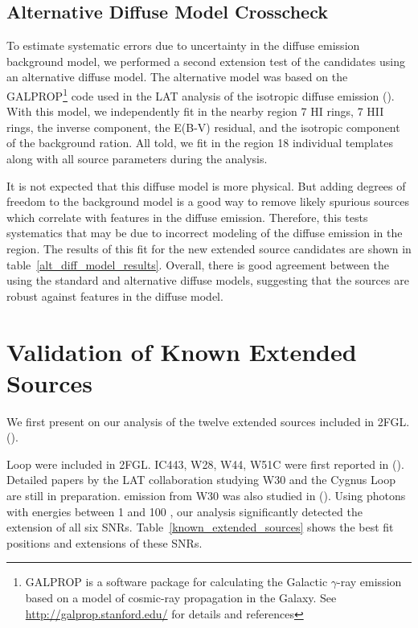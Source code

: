 \documentclass[12pt,preprint]{aastex}
\newcommand{\gev}{\text{GeV}\xspace}
\newcommand{\ts}{\text{TS}\xspace}
\begin{document}
\subsection{Alternative Diffuse Model Crosscheck}
\label{alt_diff_model_description}

To estimate systematic errors due to uncertainty in the diffuse
emission background model, we performed a second
extension test of the candidates using
an alternative diffuse
model. The alternative model was based on the GALPROP\footnote{GALPROP
is a software package for calculating the Galactic $\gamma$-ray
emission based on a model of cosmic-ray propagation in the Galaxy. See
\url{http://galprop.stanford.edu/} for details and references} code
used in the LAT analysis of the isotropic diffuse emission
(\cite{isotropic_lat}).  
With this model,
we independently fit in the nearby region 
7 HI rings, 7 HII rings, the inverse component,
the E(B-V) residual, and the isotropic component of
the background ration.
All told, we fit in the region 18 individual templates along
with all source parameters during the analysis.

It is not expected that this diffuse model is more physical.
But adding degrees of freedom to the background model is a good
way to remove likely spurious sources which correlate with features in
the diffuse emission.  Therefore, this tests systematics that may
be due to incorrect modeling of the diffuse emission in the region.
The results of this fit for the new extended source candidates are shown
in table~\ref{alt_diff_model_results}. Overall, there is good agreement
between the \ts using the standard and alternative diffuse models, 
suggesting that the sources are robust against features in the
diffuse model.


\section{Validation of Known Extended Sources}
\label{validate_known}

We first present on our analysis of the twelve extended sources
included in 2FGL.
(\cite{second_cat}).

Loop were included in 2FGL.  IC443, W28, W44, W51C were first reported in
(\cite{ic443,w28,w44,w51c}).  Detailed papers by the LAT collaboration
studying W30 and the Cygnus Loop are still in preparation.  \gev emission
from W30 was also studied in (\cite{castro_and_slane_2010}).  Using photons
with energies between 1 \gev and 100 \gev, our analysis significantly
detected the extension
of all six SNRs. Table~\ref{known_extended_sources} shows the best fit
positions and extensions of these SNRs.
\end{document}
